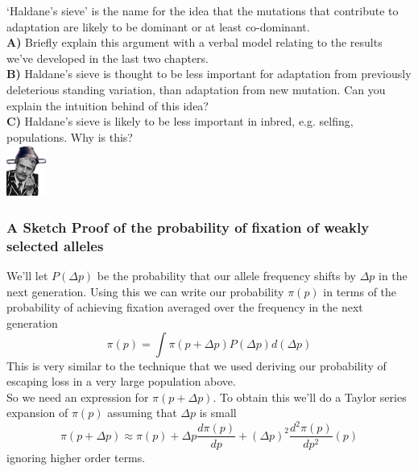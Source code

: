 \begin{tcolorbox} 
\begin{question}
`Haldane's sieve’ is the name for the idea that the mutations that contribute to adaptation are likely to be dominant or at least co-dominant. \\
{\bf A)} Briefly explain this argument with a verbal model relating to the
results we’ve developed in the last two chapters. \\
{\bf B)} Haldane’s sieve is thought to be less important for adaptation from previously deleterious standing variation, than adaptation from new mutation. Can you explain the intuition behind of this idea?\\
{\bf C)} Haldane’s sieve is likely to be less important in inbred,
e.g. selfing, populations. Why is this? \\
\includegraphics[width=0.1\textwidth]{figures/haldanes_sieve.png}

\end{question}
\end{tcolorbox}



\subsubsection{A Sketch Proof of the probability of fixation of
weakly selected alleles} \label{Section:fixation_weakly_sel}

We'll let $P(\Delta p)$ be the probability that our allele frequency
shifts by $\Delta p$ in the next generation. Using this we can write our probability $\pi(p)$ in terms of the probability of
achieving fixation averaged over the frequency in the next generation
\begin{equation}
\pi(p)  = \int \pi(p+\Delta p) P(\Delta p) d(\Delta p) \label{eqn:prob_fix_diff_step1}
\end{equation}
This is very similar to the technique that we used deriving our
probability of escaping loss in a very large population above. \\

So we need an expression for $\pi(p+\Delta p)$. To obtain this we'll
do a Taylor series expansion of $\pi(p)$ assuming that $\Delta p $ is small
\begin{equation}
\pi(p+\Delta p) \approx \pi(p) + \Delta p \frac{d\pi(p)}{dp} + (\Delta p)^2
\frac{d^2\pi(p)}{dp^2} (p)
\end{equation}
ignoring higher order terms.\\

